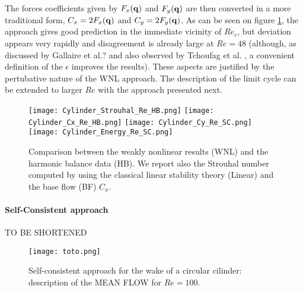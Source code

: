 \documentclass[twocolumn,10pt]{asme2ej}
\begin{document}
{\color{red} 
The forces coefficients given by $F_x({\bf q})$ and $F_y({\bf q})$ are then converted in a more traditional form, $C_x=2F_x({\bf q})$ and $C_y=2F_y({\bf q})$.
}
As can be seen on figure \ref{fig:Comp2},  the approach gives good prediction in the immediate vicinity of $Re_c$, but deviation appears very rapidly and disagreement is already large at $Re=48$ (although, as discussed by Gallaire et al.? and also observed by Tchoufag et al. \cite{Tchoufag2015}, a convenient definition of the $\epsilon$ improves the results). {\color{red} These aspects are justified by the pertubative nature of the WNL approach. The description of the limit cycle can be extended to larger $Re$ with the approach presented next.  }

\begin{figure}
\begin{center}
\texttt{[image: Cylinder\_Strouhal\_Re\_HB.png]}
\texttt{[image: Cylinder\_Cx\_Re\_HB.png]}
\texttt{[image: Cylinder\_Cy\_Re\_SC.png]}
\texttt{[image: Cylinder\_Energy\_Re\_SC.png]}
\end{center}
\caption{Comparison between the weakly nonlinear results (WNL) and the harmonic 
balance data (HB). We report also the Strouhal number computed by using the 
classical linear stability theory (Linear) and the base flow (BF) $C_x$.
}
\label{fig:Comp2}
\end{figure}


\paragraph{Self-Consistent approach}

TO BE SHORTENED


\begin{figure}
\begin{center}
\texttt{[image: toto.png]}
\end{center}
\caption{Self-consistent approach for the wake of a circular cilinder:  description of the MEAN FLOW for  $Re = 
100$.}
\label{fig:MF60}
\end{figure}
\end{document}
